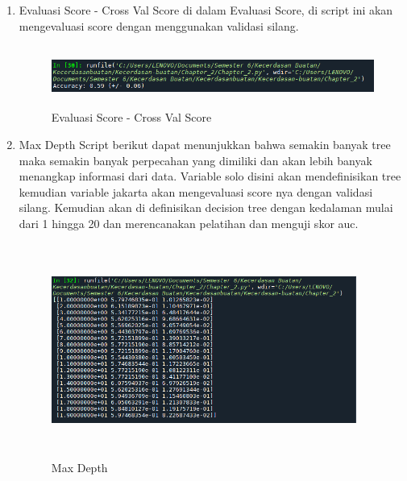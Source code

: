 \begin{enumerate}
\item Evaluasi Score - Cross Val Score
\newline di dalam Evaluasi Score, di script ini akan mengevaluasi score dengan menggunakan validasi silang. 
\begin{figure}[!htbp]
	\centering
	\includegraphics[width=14cm,height=2cm]{figures/Cp2-h.png}
	\caption{Evaluasi Score - Cross Val Score}
	\label{penanda}
\end{figure}

\item Max Depth
\newline Script berikut dapat menunjukkan bahwa semakin banyak tree maka semakin banyak perpecahan yang dimiliki dan akan lebih banyak menangkap informasi dari data. Variable solo disini akan mendefinisikan tree kemudian variable jakarta akan mengevaluasi score nya dengan validasi silang. Kemudian akan di definisikan decision tree dengan kedalaman mulai dari 1 hingga 20 dan
merencanakan pelatihan dan menguji skor auc.
\begin{figure}[!htbp]
	\centering
	\includegraphics[width=10cm,height=7cm]{figures/Cp2-i.png}
	\caption{Max Depth}
	\label{penanda}
\end{figure}


\end{enumerate}
